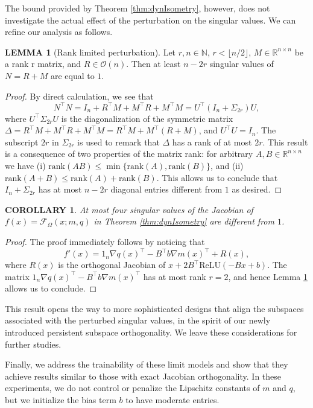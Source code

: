 \documentclass{article}
\theoremstyle{plain}
\newtheorem{corollary}[theorem]{COROLLARY}
\theoremstyle{definition}
\theoremstyle{definition}
\newtheorem{lemma}[theorem]{LEMMA}
\theoremstyle{remark}
\theoremstyle{definition}
\theoremstyle{definition}
\theoremstyle{remark}
\numberwithin{equation}{section}
\begin{document}
The bound provided by Theorem \ref{thm:dynIsometry}, however, does not investigate the actual effect of the perturbation on the singular values. We can refine our analysis as follows.
\begin{lemma}[Rank limited perturbation]\label{lemma:rankPerturbation}
Let $r,n\in\mathbb{N}$, $r<\lfloor n/2 \rfloor$, $M \in\mathbb{R}^{n\times n}$ be a rank r matrix, and $R\in\mathcal{O}(n)$. Then at least $n-2r$ singular values of $N=R+M$ are equal to $1$.
\end{lemma}
\begin{proof} By direct calculation, we see that
\[
N^\top N = I_n + R^\top M + M^\top R + M^\top M = U^\top (I_n + \Sigma_{2r})U,
\]
where $U^\top \Sigma_{2r}U$ is the diagonalization of the symmetric matrix $\Delta = R^\top M + M^\top R + M^\top M=R^\top M + M^\top(R+M)$, and $U^\top U = I_n$. The subscript $2r$ in $\Sigma_{2r}$ is used to remark that $\Delta$ has a rank of at most $2r$. This result is a consequence of two properties of the matrix rank: for arbitrary $A,B\in\mathbb{R}^{n\times n}$ we have (i) $\mathrm{rank}(AB)\leq \min\{\mathrm{rank}(A),\mathrm{rank}(B)\}$, and (ii) $\mathrm{rank}(A+B)\leq \mathrm{rank}(A)+\mathrm{rank}(B)$. This allows us to conclude that $I_n+\Sigma_{2r}$ has at most $n-2r$ diagonal entries different from $1$ as desired.
\end{proof}
\begin{corollary}
At most four singular values of the Jacobian of $f(x)=\mathcal{F}_\Omega(x;m,q)$ in Theorem \ref{thm:dynIsometry} are different from $1$.
\end{corollary}
\begin{proof}
The proof immediately follows by noticing that 
\[
f'(x) = 1_n\nabla q(x)^\top - B^\top b\nabla m(x)^\top + R(x),
\]
where $R(x)$ is the orthogonal Jacobian of $x+2B^\top \mathrm{ReLU}(-Bx+b)$. The matrix $1_n\nabla q(x)^\top - B^\top b\nabla m(x)^\top$ has at most rank $r=2$, and hence Lemma \ref{lemma:rankPerturbation} allows us to conclude.
\end{proof}
This result opens the way to more sophisticated designs that align the subspaces associated with the perturbed singular values, in the spirit of our newly introduced persistent subspace orthogonality. We leave these considerations for further studies.

Finally, we address the trainability of these limit models and show that they achieve results similar to those with exact Jacobian orthogonality. In these experiments, we do not control or penalize the Lipschitz constants of $m$ and $q$, but we initialize the bias term $b$ to have moderate entries.
\end{document}

